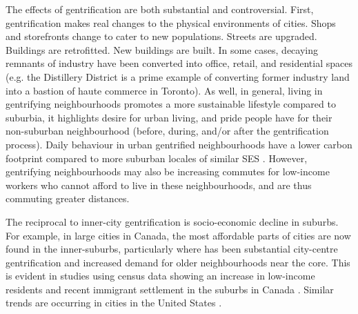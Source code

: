The effects of gentrification are both substantial and controversial. First, gentrification makes real changes to the physical environments of cities. Shops and storefronts change to cater to new populations. Streets are upgraded. Buildings are retrofitted. New buildings are built. In some cases, decaying remnants of industry have been converted into office, retail, and residential spaces (e.g. the Distillery District is a prime example of converting former industry land into a bastion of haute commerce in Toronto). As well, in general, living in gentrifying neighbourhoods promotes a more sustainable lifestyle compared to suburbia, it highlights desire for urban living, and pride people have for their non-suburban neighbourhood (before, during, and/or after the gentrification process). Daily behaviour in urban gentrified neighbourhoods have a lower carbon footprint compared to more suburban locales of similar SES \cite{ewing_compactness_2015}. However, gentrifying neighbourhoods may also be increasing commutes for low-income workers who cannot afford to live in these neighbourhoods, and are thus commuting greater distances.

The reciprocal to inner-city gentrification is socio-economic decline in suburbs. For example, in large cities in Canada, the most affordable parts of cities are now found in the inner-suburbs, particularly where has been substantial city-centre gentrification and increased demand for older neighbourhoods near the core. This is evident in studies using census data showing an increase in low-income residents and recent immigrant settlement in the suburbs in Canada \cite{bourne_changing_2001,ades_are_2012,breau_pulling_2018}. Similar trends are occurring in cities in the United States \cite{ehrenhalt_great_2012,delmelle_differentiating_2017}.

